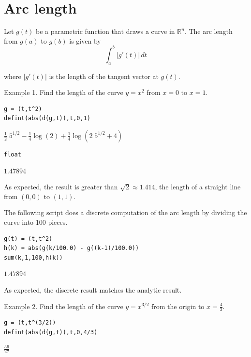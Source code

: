 
\newpage

\section{Arc length}

Let $g(t)$ be a parametric function that draws a curve in $\mathbb R^n$.
The arc length from $g(a)$ to $g(b)$ is given by
\begin{equation*}
\int_a^b|g'(t)|\,dt
\end{equation*}

where $|g'(t)|$ is the length of the tangent vector at $g(t)$.

\bigskip
Example 1.
Find the length of the curve $y=x^2$ from $x=0$ to $x=1$.

{\color{blue}
\begin{verbatim}
g = (t,t^2)
defint(abs(d(g,t)),t,0,1)
\end{verbatim}}

$
\tfrac{1}{2}\;5^{1/2}
-\tfrac{1}{4}\log(2)
+\tfrac{1}{4}\log(2\;5^{1/2}+4)
$

{\color{blue}
\begin{verbatim}
float
\end{verbatim}}

$1.47894$

\bigskip
As expected, the result is greater than $\sqrt2\approx1.414$,
the length of a straight line from $(0,0)$ to $(1,1)$.

\bigskip
The following script does a discrete computation of the arc length
by dividing the curve into 100 pieces.

{\color{blue}
\begin{verbatim}
g(t) = (t,t^2)
h(k) = abs(g(k/100.0) - g((k-1)/100.0))
sum(k,1,100,h(k))
\end{verbatim}}

$1.47894$

\bigskip
As expected, the discrete result matches the analytic result.

\bigskip
Example 2.
Find the length of the curve $y=x^{3/2}$ from the origin to
$x=\tfrac{4}{3}$.

{\color{blue}
\begin{verbatim}
g = (t,t^(3/2))
defint(abs(d(g,t)),t,0,4/3)
\end{verbatim}}

$\displaystyle \tfrac{56}{27}$


